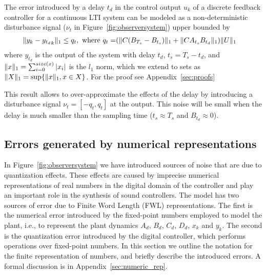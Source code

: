 \documentclass[sigconf]{llncs}
\DeclarePairedDelimiter\norm{\lVert}{\rVert}
\newcommand{\mat}[1]{{#1}}
\renewcommand{\vec}[1]{{#1}}
\begin{document}
\begin{theorem}
%
The error introduced by a delay $t_d$ in the control output $\vec{u}_k$ of a
discrete feedback controller for a continuous LTI system can be modeled as a
non-deterministic disturbance signal ($\nu_t$ in
Figure~\ref{fig:observersystem}) upper bounded by
%
\begin{align}
\norm{\vec{y}_{k}-{\vec{y}_{t_d}}_{k}}_1 \leq q_t, \text{ where } q_t=&(\norm{\mat{C}(\mat{B}_{T_s}-\mat{B}_{t_s})}_1+\norm{\mat{C}\mat{A}_{t_s}\mat{B}_{t_d}}_1)\norm{U}_1
\end{align}
where $\vec{y}_{t_d}$ is the output of the system with delay $t_d$, $t_s=T_s-t_d$,
and $\norm{\vec{x}}_1=\sum_{i=0}^{size(\vec{x})} |\vec{x}_i|$ is the $l_1$ norm, 
which we extend to sets as $\norm{X}_1 = \sup \{\norm{\vec{x}}_1, \vec{x} \in X\}$.  
For the proof see Appendix~\ref{sec:proofs}
\end{theorem}
%
This result allows to over-approximate the effects of the delay by introducing a disturbance signal $\nu_t=[-q_t, q_t]$ at the output.
 This noise will be small when the delay is much smaller than the sampling time ($t_s\approx T_s$ and $\mat{B}_{t_d} \approx 0$).

\subsection{Errors generated by numerical representations} 
\label{sec:numeric_rep2}

In Figure~\ref{fig:observersystem} we have introduced sources of noise that
are due to quantization effects.  These effects are caused by imprecise
numerical representations of real numbers in the digital domain of the
controller and play an important role in the synthesis of sound controllers. 
The model has two sources of error due to Finite Word Length (FWL)
representations.  The first is the numerical error introduced by the
fixed-point numbers employed to model the plant, i.e., to represent the
plant dynamics $A_d$, $B_d$, $C_d$, $D_d$, $x_k$ and $y_k$.  The second is
the quantization error introduced by the digital controller, which performs
operations over fixed-point numbers.  In this section we outline the
notation for the finite representation of numbers, and briefly describe the
introduced errors.  A formal discussion is in
Appendix~\ref{sec:numeric_rep}.
\end{document}
